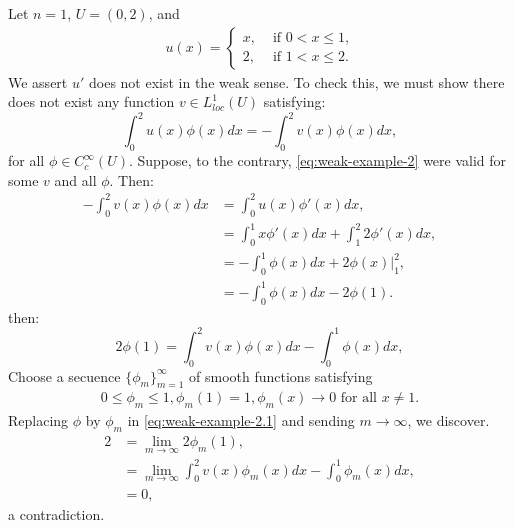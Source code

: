 \begin{example}{}
  Let $n=1$, $U=(0,2)$, and
  \begin{align*}
    u(x)= 
    \begin{cases}
      x, &\text{ if } 0<x\leq 1 \text{,} \\
      2, &\text{ if } 1<x\leq 2 .
    \end{cases}
  \end{align*}
  We assert $u'$ does not exist in the weak sense. To check this, we must show there does not exist any function $v\in L^{1}_{loc}(U)$ satisfying:
  \begin{equation}\label{eq:weak-example-2}
    \int_{0}^{2}u(x)\phi(x)dx=-\int_{0}^{2}v(x)\phi(x)dx,
  \end{equation}
  for all $\phi\in C^{\infty}_{c}(U)$. Suppose, to the contrary, \ref{eq:weak-example-2} were valid for some $v$ and all $\phi$. Then:
  \begin{align*}
    -\int_{0}^{2}v(x)\phi(x)dx&=\int_{0}^{2}u(x)\phi'(x)dx,\\
    &=\int_{0}^{1}x\phi'(x)dx+\int_{1}^{2}2\phi'(x)dx,\\
    &=-\int_{0}^{1}\phi(x)dx+2\phi(x)\bigg|_{1}^{2},\\
    &=-\int_{0}^{1}\phi(x)dx-2\phi(1).
  \end{align*}
  then:
  \begin{equation}\label{eq:weak-example-2.1}
    2\phi(1)=\int_{0}^{2}v(x)\phi(x)dx-\int_{0}^{1}\phi(x)dx,
  \end{equation}
  Choose a secuence $\{\phi_{m}\}_{m=1}^{\infty}$ of smooth functions satisfying
  \begin{align*}
    0\leq \phi_{m}\leq 1, \phi_m(1)=1,\phi_m(x)\to 0\text{ for all }x\neq 1.
  \end{align*}
  Replacing $\phi$ by $\phi_m$ in \ref{eq:weak-example-2.1} and sending $m\to \infty$, we discover.
  \begin{align*}
    2&=\lim_{m \to \infty}2\phi_m(1),\\
    &=\lim_{m \to \infty}\int_{0}^{2}v(x)\phi_m(x)dx-\int_{0}^{1}\phi_m(x)dx,\\
    &=0,
  \end{align*}
  a contradiction.
\end{example}
